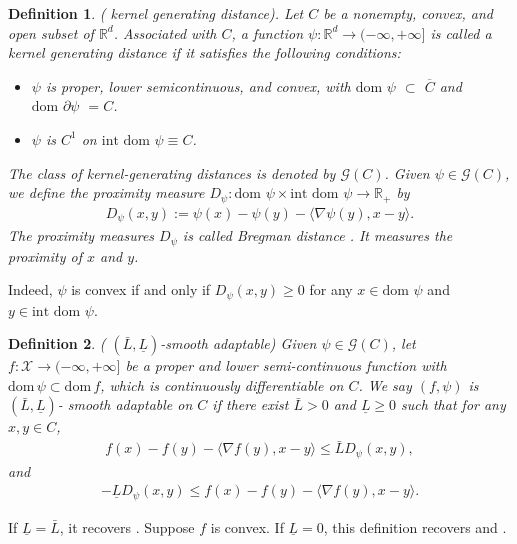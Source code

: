 \documentclass[letterpaper]{article} %
\newtheorem{definition}{Definition}
\begin{document}
	\begin{definition}\label{def:kernel}
		(\cite{AuslenderT06,BolteSTV18First} kernel generating distance). Let $C$ be a nonempty, convex, and open subset of $\mathbb{R}^{d}$. Associated with $C$, a function $\psi:\mathbb{R}^{d} \rightarrow (-\infty, +\infty]$ is called a kernel generating distance if it satisfies the following conditions:
		\begin{itemize}
			\item $\psi$ is proper, lower semicontinuous, and convex, with $\text{dom } \psi$ $\subset$ $\overline{C}$ and  $\text{dom } \partial \psi$  $=C$.
			\item  $\psi$ is $C^{1}$ on $\text{int dom } \psi \equiv C$.
		\end{itemize}
		The class of kernel-generating distances is denoted by $\mathcal{G}(C)$. Given $\psi\in\mathcal{G}(C)$, we  define the proximity measure $D_{\psi} : \text{dom } \psi \times \text{int dom }\psi \rightarrow \mathbb{R}_{+}$ by
		\begin{eqnarray}
			D_{\psi}(x, y) := \psi (x) - \psi (y) - \langle \nabla\psi(y), x - y\rangle.
		\end{eqnarray}
		The proximity measures $D_{\psi}$ is called Bregman distance \cite{Bregman67The}. It measures the proximity of $x$ and $y$.
	\end{definition}
	Indeed, $\psi$ is convex if and only if $D_{\psi}(x,y) \ge 0$ for any $x\in\text{dom }\psi$ and $y\in\text{int dom }\psi$.

	\begin{definition}\label{Ll-smooth}
		(\cite{MukkamalaOPS20} $(\bar{L},\underline{L})$-smooth adaptable) Given $\psi\in\mathcal{G}(C)$, let $f:\mathcal{X}\rightarrow(-\infty,+\infty]$ be a proper and lower semi-continuous function with $\mathrm{dom}\,\psi\subset\mathrm{dom}\,f$, which is continuously differentiable on $C$. We say $(f, \psi)$ is $(\bar{L},\underline{L})$- smooth adaptable  on $C$ if there exist $\bar{L}>0$ and $\underline{L}\ge0$ such that for any $x,y\in C$,
		\begin{eqnarray}
			f(x)-f(y)-\langle\nabla f(y),x-y\rangle\le \bar{L} D_{\psi}(x,y),\label{L_upper}
		\end{eqnarray}
		and
		\begin{eqnarray}
			-\underline{L}D_{\psi}(x,y)\le f(x)-f(y)-\langle \nabla f(y),x-y\rangle.\label{L_lower}
		\end{eqnarray}
	\end{definition}
	If $\underline{L}=\bar{L}$, it recovers \cite[Definition 2.2]{BolteSTV18First}. Suppose  $f$ is convex. If $\underline{L}=0$, this definition recovers \cite[Lemma 1]{BauschkeBT17} and \cite[Definition 1.1]{LuFN18}.
\end{document}
